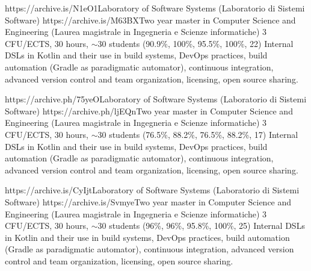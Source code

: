 \begin{outerlist}
        \unibocourse
        {https://archive.is/N1eO1}{Laboratory of Software Systems (Laboratorio di Sistemi Software)}
        {https://archive.is/M63BX}{Two year master in Computer Science and Engineering (Laurea magistrale in Ingegneria e Scienze informatiche)}
        {3 CFU/ECTS, 30 hours, $\sim$30 students}
        {(90.9\%, 100\%, 95.5\%, 100\%, 22)}
        {Internal DSLs in Kotlin and their use in build systems, DevOps practices, build automation (Gradle as paradigmatic automator), continuous integration, advanced version control and team organization, licensing, open source sharing.}
    \item[2021/22]
        \unibocourse
        {https://archive.ph/75yeO}{Laboratory of Software Systems (Laboratorio di Sistemi Software)}
        {https://archive.ph/ljEQn}{Two year master in Computer Science and Engineering (Laurea magistrale in Ingegneria e Scienze informatiche)}
        {3 CFU/ECTS, 30 hours, $\sim$30 students}
        {(76.5\%, 88.2\%, 76.5\%, 88.2\%, 17)}
        {Internal DSLs in Kotlin and their use in build systems, DevOps practices, build automation (Gradle as paradigmatic automator), continuous integration, advanced version control and team organization, licensing, open source sharing.}
    \item[2020/21]
        \unibocourse
        {https://archive.is/CyIjt}{Laboratory of Software Systems (Laboratorio di Sistemi Software)}
        {https://archive.is/Svmye}{Two year master in Computer Science and Engineering (Laurea magistrale in Ingegneria e Scienze informatiche)}
        {3 CFU/ECTS, 30 hours, $\sim$30 students}
        {(96\%, 96\%, 95.8\%, 100\%, 25)}
        {Internal DSLs in Kotlin and their use in build systems, DevOps practices, build automation (Gradle as paradigmatic automator), continuous integration, advanced version control and team organization, licensing, open source sharing.}
\end{outerlist}

